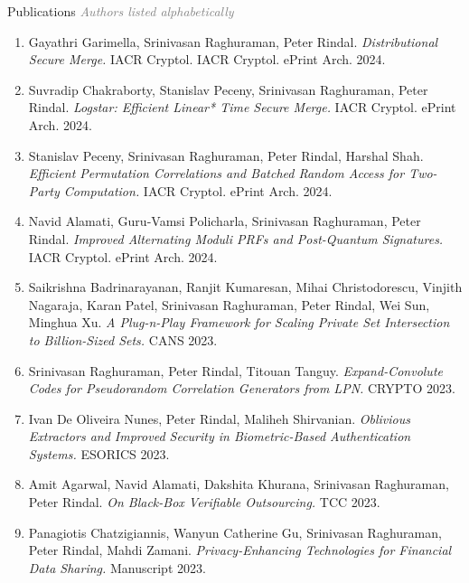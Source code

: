 \documentclass{resume} %
\begin{document}
\begin{rSection}{Publications}
\hfill {\scriptsize \textcolor{gray}{\emph{Authors listed alphabetically}}}

\begin{enumerate}[label=C\arabic* --]
	\item Gayathri Garimella,  Srinivasan Raghuraman, Peter Rindal. \emph{Distributional Secure Merge.} IACR Cryptol.  IACR Cryptol. ePrint Arch. 2024.
	
	\item Suvradip Chakraborty, Stanislav Peceny, Srinivasan Raghuraman, Peter Rindal. \emph{Logstar: Efficient Linear* Time Secure Merge.} IACR Cryptol. ePrint Arch. 2024.
	
	\item Stanislav Peceny, Srinivasan Raghuraman, Peter Rindal, Harshal Shah. \emph{Efficient Permutation Correlations and Batched Random Access for Two-Party Computation.} IACR Cryptol. ePrint Arch. 2024.
	
	\item Navid Alamati, Guru-Vamsi Policharla, Srinivasan Raghuraman, Peter Rindal. \emph{Improved Alternating Moduli PRFs and Post-Quantum Signatures.} IACR Cryptol. ePrint Arch. 2024.
	
	\item 	Saikrishna Badrinarayanan, Ranjit Kumaresan, Mihai Christodorescu, Vinjith Nagaraja, Karan Patel, Srinivasan Raghuraman, Peter Rindal, Wei Sun, Minghua Xu. \emph{A Plug-n-Play Framework for Scaling Private Set Intersection to Billion-Sized Sets.} CANS 2023.
	
	\item Srinivasan Raghuraman, Peter Rindal, Titouan Tanguy. \emph{Expand-Convolute Codes for Pseudorandom Correlation Generators from LPN.} CRYPTO 2023.
	
	\item 	Ivan De Oliveira Nunes, Peter Rindal, Maliheh Shirvanian. \emph{Oblivious Extractors and Improved Security in Biometric-Based Authentication Systems.} ESORICS 2023.
	
	\item 	Amit Agarwal, Navid Alamati, Dakshita Khurana, Srinivasan Raghuraman, Peter Rindal. \emph{On Black-Box Verifiable Outsourcing.} TCC 2023.
	
	\item 	Panagiotis Chatzigiannis, Wanyun Catherine Gu, Srinivasan Raghuraman, Peter Rindal, Mahdi Zamani. \emph{Privacy-Enhancing Technologies for Financial Data Sharing.} Manuscript 2023.
	

\end{enumerate}
\end{rSection}
\end{document}
